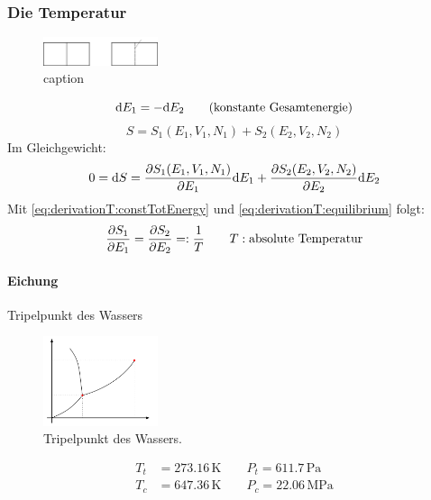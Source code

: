 \subsubsection{Die Temperatur}
\begin{figure}[H]
    \begin{center}
        \includegraphics[width=0.3\textwidth]{../img/derivationT.pdf}
        \caption{caption}  %
        \label{img:derivationT}
    \end{center}
\end{figure}
\begin{equation}
    \label{eq:derivationT:constTotEnergy}
    \mathrm{d} E_1 = - \mathrm{d} E_2 \qquad \text{(konstante Gesamtenergie)}
\end{equation}
\begin{equation}
    S = S_1(E_1, V_1, N_1) + S_2 (E_2, V_2, N_2)
\end{equation}
Im Gleichgewicht:
\begin{equation}
    \label{eq:derivationT:equilibrium}
    0 = \mathrm{d} S = \frac{\partial S_1(E_1, V_1, N_1)}{\partial E_1} \mathrm{d} E_1 + \frac{\partial S_2 (E_2, V_2, N_2)}{\partial E_2} \mathrm{d} E_2
\end{equation}
Mit \autoref{eq:derivationT:constTotEnergy} und \autoref{eq:derivationT:equilibrium} folgt:
\begin{equation}
    \frac{\partial S_1}{\partial E_1} = \frac{\partial S_2}{\partial E_2} =: \frac{1}{T} \qquad T:\text{absolute Temperatur}
\end{equation}

\paragraph{Eichung} Tripelpunkt des Wassers
\begin{figure}[H]
    \begin{center}
        \includegraphics[width=0.3\textwidth]{../img/tripelpoint.pdf}
        \caption{Tripelpunkt des Wassers.}
        \label{img:tripelpoint}
    \end{center}
\end{figure}
\begin{equation}
    \begin{split}
        T_t &= 273.16 \, \text{K} \qquad P_t = 611.7 \, \text{Pa} \\
        T_c &= 647.36 \, \text{K} \qquad P_c = 22.06 \, \text{MPa}
    \end{split}
\end{equation}

